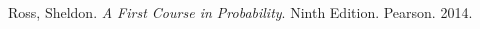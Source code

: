 \documentclass[12pt]{article}
\theoremstyle{plain}
\theoremstyle{definition}
\theoremstyle{remark}
\begin{document}
\begin{thebibliography}{13}

 Ross, Sheldon. \textit{A First Course in Probability}. Ninth Edition. Pearson. 2014.



 
\end{thebibliography}
\end{document}
